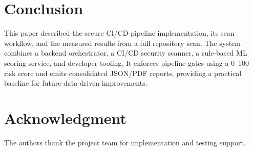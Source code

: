\documentclass[conference]{IEEEtran}
\begin{document}
\section{Conclusion}
This paper described the secure CI/CD pipeline implementation, its scan workflow, and the measured results from a full repository scan. The system combines a backend orchestrator, a CI/CD security scanner, a rule‑based ML scoring service, and developer tooling. It enforces pipeline gates using a 0--100 risk score and emits consolidated JSON/PDF reports, providing a practical baseline for future data‑driven improvements.

\section*{Acknowledgment}
The authors thank the project team for implementation and testing support.
\end{document}
